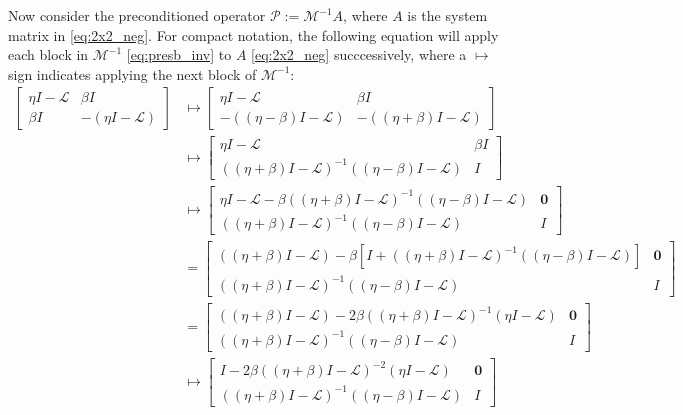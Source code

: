 \documentclass[a4paper,10pt]{article}
\begin{document}
Now consider the preconditioned operator $\mathcal{P} := \mathcal{M}^{-1}A$,
where $A$ is the system matrix in \eqref{eq:2x2_neg}. For compact notation,
the following equation will apply each block in $\mathcal{M}^{-1}$ \eqref{eq:presb_inv}
to $A$ \eqref{eq:2x2_neg} succcessively, where a $\mapsto$ sign indicates applying
the next block of $\mathcal{M}^{-1}$:
%
\begin{align*}
\begin{bmatrix} \eta I - \mathcal{L} & \beta I\\
	\beta I & -(\eta I - \mathcal{L}) \end{bmatrix} & \mapsto 
\begin{bmatrix} \eta I - \mathcal{L} & \beta I \\
	-( (\eta-\beta)I - \mathcal{L}) & -( (\eta+\beta)I - \mathcal{L}) \end{bmatrix} \\
& \mapsto \begin{bmatrix} \eta I - \mathcal{L} & \beta I \\
	((\eta+\beta)I - \mathcal{L})^{-1}( (\eta-\beta)I - \mathcal{L}) & I \end{bmatrix} \\
& \mapsto \begin{bmatrix} \eta I - \mathcal{L} -
		\beta((\eta+\beta)I - \mathcal{L})^{-1}( (\eta-\beta)I - \mathcal{L}) & \mathbf{0} \\
	((\eta+\beta)I - \mathcal{L})^{-1}( (\eta-\beta)I - \mathcal{L}) & I \end{bmatrix} \\
& = \begin{bmatrix} ((\eta+\beta)I - \mathcal{L}) -
		\beta[I + ((\eta+\beta)I - \mathcal{L})^{-1}((\eta-\beta)I - \mathcal{L})] & \mathbf{0} \\
	((\eta+\beta)I - \mathcal{L})^{-1}( (\eta-\beta)I - \mathcal{L}) & I \end{bmatrix} \\
& = \begin{bmatrix} ((\eta+\beta)I - \mathcal{L}) -
		2\beta((\eta+\beta)I - \mathcal{L})^{-1}(\eta I - \mathcal{L}) & \mathbf{0} \\
	((\eta+\beta)I - \mathcal{L})^{-1}( (\eta-\beta)I - \mathcal{L}) & I \end{bmatrix} \\
& \mapsto \begin{bmatrix} I -
		2\beta((\eta+\beta)I - \mathcal{L})^{-2}(\eta I - \mathcal{L}) & \mathbf{0} \\
	((\eta+\beta)I - \mathcal{L})^{-1}( (\eta-\beta)I - \mathcal{L}) & I \end{bmatrix} \\

\end{align*}
\end{document}
